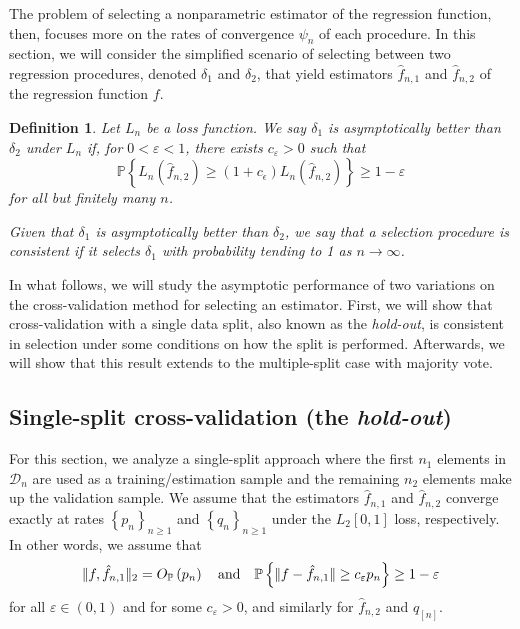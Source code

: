 \documentclass[11pt, letter paper]{article}
\newcommand{\1}{\mathmybb{1}}
\newtheorem{definition}{Definition}[section]
\newcommand{\0}{\emptyset}
\newcommand{\prob}{\mathbb{P}}
\newcommand{\paren}[1]{\left(#1 \right)}
\newcommand{\set}[1]{\left\{ #1 \right\}}
\newcommand{\norm}[1]{|\hspace{-1pt}|#1 |\hspace{-1pt}|}
\newcommand{\data}{\mathcal{D}_{n}}
\newcommand{\Loss}[1]{L_{n}\paren{#1}}
\newcommand{\Op}[1]{O_{\prob}\paren{#1}}
\newcommand{\fhat}[2]{\hat{f}_{#1, #2}}
\begin{document}
The problem of selecting a nonparametric estimator of the regression function, then, focuses more on the rates of convergence \(\psi_{n}\) of each procedure. In this section, we will consider the simplified scenario of selecting between 
two regression procedures, denoted \(\delta_{1}\) and \(\delta_{2}\), that yield estimators \(\hat{f}_{n, 1}\) and \(\hat{f}_{n, 2}\) of the regression function \(f\).

\begin{definition}
    Let \(L_{n}\) be a loss function. We say \(\delta_{1}\) is \emph{asymptotically better} than \(\delta_{2}\) under \(L_{n}\) if, for \(0<\varepsilon<1\), there exists \(c_{\varepsilon}>0\) such that
    \[\prob\set{\Loss{\fhat{n}{2}}\geq (1+c_{\epsilon})\Loss{\fhat{n}{2}} }\geq 1-\varepsilon\]
    for all but finitely many \(n\).

    Given that \(\delta_{1}\) is asymptotically better than \(\delta_{2}\), we say that a selection procedure is consistent if it selects \(\delta_{1}\) with probability tending to 1 as \(n\to\infty\).
\end{definition}

In what follows, we will study the asymptotic performance of two variations on the cross-validation method for selecting an estimator. First, we will show that cross-validation with a single data split, also known as the \emph{hold-out}, is consistent in selection under some conditions on how the split is performed. Afterwards, we will show that this result extends to the multiple-split case with majority vote.

\subsection{Single-split cross-validation (the \emph{hold-out})}

For this section, we analyze a single-split approach where the first \(n_1\) elements in \(\data\) are used as a training/estimation sample and the remaining \(n_2\) elements make up the validation sample. We assume that the estimators \(\fhat{n}{1}\) and \(\fhat{n}{2}\) converge exactly at rates \(\set{p_{n}}_{n\geq 1}\) and \(\set{q_{n}}_{n\geq 1}\) under the \(L_{2}[0,1]\) loss, respectively. In other words, we assume that
\[\norm{f, \fhat{n}{1}}_{2} = \Op{p_{n}} \quad\text{and}\quad \prob\set{\norm{f-\fhat{n}{1}} \geq c_{\varepsilon}p_{n}} \geq 1-\varepsilon\]
for all \(\varepsilon\in(0,1)\) and for some \(c_{\varepsilon}>0\), and similarly for \(\fhat{n}{2}\) and \(q_[n]\).
\end{document}
